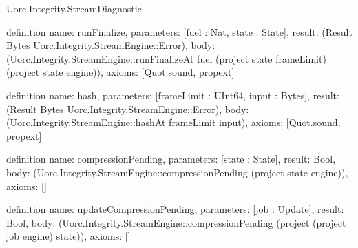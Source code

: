 \begin{lexlean}{Uorc.Integrity.StreamDiagnostic}
\begin{semanticmodule}
definition{
  name: runFinalize,
  parameters: [fuel : Nat, state : State],
  result: (Result Bytes Uorc.Integrity.StreamEngine::Error),
  body: (Uorc.Integrity.StreamEngine::runFinalizeAt fuel (project state frameLimit) (project state engine)),
  axioms: [Quot.sound, propext]
}

definition{
  name: hash,
  parameters: [frameLimit : UInt64, input : Bytes],
  result: (Result Bytes Uorc.Integrity.StreamEngine::Error),
  body: (Uorc.Integrity.StreamEngine::hashAt frameLimit input),
  axioms: [Quot.sound, propext]
}

definition{
  name: compressionPending,
  parameters: [state : State],
  result: Bool,
  body: (Uorc.Integrity.StreamEngine::compressionPending (project state engine)),
  axioms: []
}

definition{
  name: updateCompressionPending,
  parameters: [job : Update],
  result: Bool,
  body: (Uorc.Integrity.StreamEngine::compressionPending (project (project job engine) state)),
  axioms: []
}
\end{semanticmodule}
\end{lexlean}
